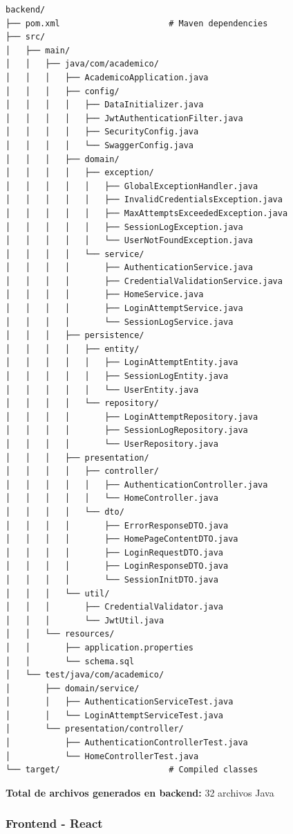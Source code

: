 \documentclass[11pt,a4paper]{article}
\begin{document}
\begin{verbatim}
backend/
├── pom.xml                      # Maven dependencies
├── src/
│   ├── main/
│   │   ├── java/com/academico/
│   │   │   ├── AcademicoApplication.java
│   │   │   ├── config/
│   │   │   │   ├── DataInitializer.java
│   │   │   │   ├── JwtAuthenticationFilter.java
│   │   │   │   ├── SecurityConfig.java
│   │   │   │   └── SwaggerConfig.java
│   │   │   ├── domain/
│   │   │   │   ├── exception/
│   │   │   │   │   ├── GlobalExceptionHandler.java
│   │   │   │   │   ├── InvalidCredentialsException.java
│   │   │   │   │   ├── MaxAttemptsExceededException.java
│   │   │   │   │   ├── SessionLogException.java
│   │   │   │   │   └── UserNotFoundException.java
│   │   │   │   └── service/
│   │   │   │       ├── AuthenticationService.java
│   │   │   │       ├── CredentialValidationService.java
│   │   │   │       ├── HomeService.java
│   │   │   │       ├── LoginAttemptService.java
│   │   │   │       └── SessionLogService.java
│   │   │   ├── persistence/
│   │   │   │   ├── entity/
│   │   │   │   │   ├── LoginAttemptEntity.java
│   │   │   │   │   ├── SessionLogEntity.java
│   │   │   │   │   └── UserEntity.java
│   │   │   │   └── repository/
│   │   │   │       ├── LoginAttemptRepository.java
│   │   │   │       ├── SessionLogRepository.java
│   │   │   │       └── UserRepository.java
│   │   │   ├── presentation/
│   │   │   │   ├── controller/
│   │   │   │   │   ├── AuthenticationController.java
│   │   │   │   │   └── HomeController.java
│   │   │   │   └── dto/
│   │   │   │       ├── ErrorResponseDTO.java
│   │   │   │       ├── HomePageContentDTO.java
│   │   │   │       ├── LoginRequestDTO.java
│   │   │   │       ├── LoginResponseDTO.java
│   │   │   │       └── SessionInitDTO.java
│   │   │   └── util/
│   │   │       ├── CredentialValidator.java
│   │   │       └── JwtUtil.java
│   │   └── resources/
│   │       ├── application.properties
│   │       └── schema.sql
│   └── test/java/com/academico/
│       ├── domain/service/
│       │   ├── AuthenticationServiceTest.java
│       │   └── LoginAttemptServiceTest.java
│       └── presentation/controller/
│           ├── AuthenticationControllerTest.java
│           └── HomeControllerTest.java
└── target/                      # Compiled classes
\end{verbatim}

\textbf{Total de archivos generados en backend:} 32 archivos Java

\subsubsection{Frontend - React}
\end{document}
